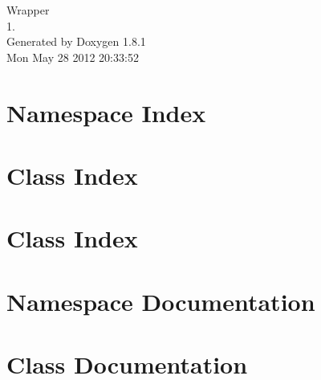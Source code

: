 \documentclass{book}
\begin{document}
\hypersetup{pageanchor=false,citecolor=blue}
\begin{titlepage}
\vspace*{7cm}
\begin{center}
{\Large Wrapper \\[1ex]\large 1. }\\
\vspace*{1cm}
{\large Generated by Doxygen 1.8.1}\\
\vspace*{0.5cm}
{\small Mon May 28 2012 20:33:52}\\
\end{center}
\end{titlepage}
\clearemptydoublepage
{}
\tableofcontents
\clearemptydoublepage
{}
\hypersetup{pageanchor=true,citecolor=blue}
\chapter{Namespace Index}

\chapter{Class Index}

\chapter{Class Index}

\chapter{Namespace Documentation}

\chapter{Class Documentation}












































\printindex
\end{document}
